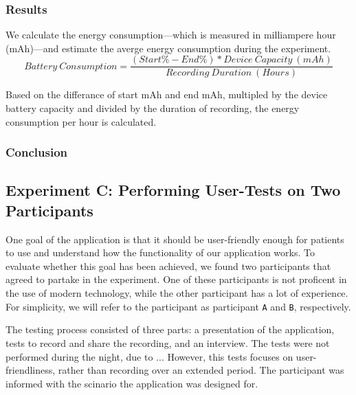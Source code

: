 \subsubsection{Results}

We calculate the energy consumption---which is measured in milliampere hour (mAh)---and estimate the averge energy consumption during the experiment. 
\begin{equation} \label{losscount}
Battery\ Consumption = \frac{(Start\% - End\%) * Device\ Capacity\ (mAh)}{Recording\ Duration\ (Hours)}
\end{equation}

Based on the differance of start mAh and end mAh, multipled by the device battery capacity and divided by the duration of recording, the energy consumption per hour is calculated. 


\subsubsection{Conclusion}


\subsection{Experiment C: Performing User-Tests on Two Participants}
One goal of the application is that it should be user-friendly enough for patients to use and understand how the functionality of our application works. To evaluate whether this goal has been achieved, we found two participants that agreed to partake in the experiment. One of these participants is not proficent in the use of modern technology, while the other participant has a lot of experience. For simplicity, we will refer to the participant as participant \verb|A| and \verb|B|, respectively. 

The testing process consisted of three parts: a presentation of the application, tests to record and share the recording, and an interview. The tests were not performed during the night, due to ... However, this tests focuses on user-friendliness, rather than recording over an extended period. The participant was informed with the scinario the application was designed for. 

